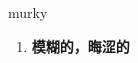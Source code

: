 
\begin{frame}
{\huge murky}
\begin{center}
\begin{enumerate}\Large
  \item \textbf{模糊的，晦涩的}
\end{enumerate}
\end{center}
\end{frame}
